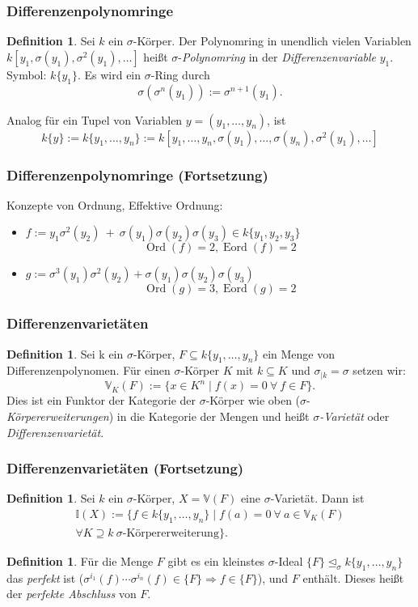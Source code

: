 \documentclass{beamer}
\def\I{\mathbb{I}}
\def\VV{\mathbb{V}}
\def\s{\sigma}
\def\si{\unlhd_{\sigma}}
\theoremstyle{definition}
\newtheorem{defn}[satz]{Definition}
\begin{document}
\begin{frame}\frametitle{Differenzenpolynomringe}
\begin{defn}
Sei $k$ ein $\s$-Körper. Der Polynomring in unendlich vielen Variablen $k[y_1,\s(y_1),\s^2(y_1),\ldots]$ heißt $\s$-\emph{Polynomring} in der \emph{Differenzenvariable} $y_1$. Symbol: $k\{y_1\}.$
Es wird ein $\s$-Ring durch $$\s( \s^n(y_1)) := \s^{n+1}(y_1).$$

 Analog für ein Tupel von Variablen $y=(y_1,\ldots,y_n)$, ist $$ k\{y\} := k\{y_1,\ldots,y_n\} := k[y_1,\ldots,y_n,\s(y_1),\ldots,\s(y_n),\s^2(y_1),\ldots] $$
\end{defn}
\end{frame}

\begin{frame}\frametitle{Differenzenpolynomringe (Fortsetzung)}
Konzepte von Ordnung, Effektive Ordnung:
\begin{itemize}
\item $ f:= y_1 \s^2(y_2)~+~\s(y_1)\s(y_2)\s(y_3) \in k\{y_1,y_2,y_3\}$
$$ \operatorname{Ord}(f) = 2, \operatorname{Eord}(f) = 2 $$
\item $g := \s^3(y_1) \s^2(y_2) + \s(y_1)\s(y_2)\s(y_3)$
$$ \operatorname{Ord}(g) = 3, \operatorname{Eord}(g) = 2 $$
\end{itemize}
\end{frame}



\begin{frame}\frametitle{Differenzenvarietäten}
\begin{defn}
Sei k ein $\s$-Körper, $F \subseteq k\{y_1,\ldots,y_n\}$ ein Menge von Differenzenpolynomen. 
Für einen $\s$-Körper $K$ mit $k \subseteq K$ und $\s_{|k} = \s$ setzen wir:
$$\VV_K(F) := \{ x \in K^n \mid f(x) = 0~\forall~ f \in F \}.$$
Dies ist ein Funktor der Kategorie der $\s$-Körper wie oben ($\s$-\emph{Körpererweiterungen}) in die Kategorie der Mengen und heißt \emph{$\s$-Varietät} oder \emph{Differenzenvarietät}.
\end{defn}
\end{frame}

\begin{frame}\frametitle{Differenzenvarietäten (Fortsetzung)}
\begin{defn}
Sei $k$ ein $\s$-Körper, $X = \VV(F)$ eine $\s$-Varietät. Dann ist 
\begin{align*} \I(X) := \{ f \in k\{y_1,\ldots,y_n \} \mid f(a) = 0~\forall~a \in \VV_K(F) \\ \forall K \supseteq k ~ \s \text{-Körpererweiterung} \}. 
\end{align*}
\end{defn}

\begin{defn}
Für die Menge $F$ gibt es ein kleinstes $\s$-Ideal $\{F\} \si k\{y_1,\ldots,y_n\}$ das \emph{perfekt} ist ($\sigma^{i_1}(f) \cdots \sigma^{i_n}(f) \in \{F\} \Rightarrow f \in \{F\}$), und $F$ enthält. 
Dieses heißt der \emph{perfekte Abschluss} von $F$.
\end{defn}
\end{frame}
\end{document}
